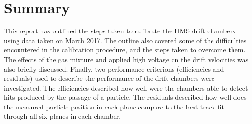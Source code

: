 \documentclass[journal, a4paper]{IEEEtran}
\begin{document}
\section{Summary}
This report has outlined the steps taken to calibrate the HMS drift chambers using data taken on March 2017. The outline
also covered some of the difficulties encountered in the calibration procedure, and the steps taken to overcome them. The effects
of the gas mixture and applied high voltage on the drift velocities was also briefly discussed. Finally, two
performance criterions (efficiencies and residuals) used to describe the performance of the drift chambers were investigated. The
efficiencies described how well were the chambers able to detect hits produced by the passage of a particle. The residuals described
how well does the measured particle position in each plane compare to the best track fit through all six planes in each chamber.




\end{document}
